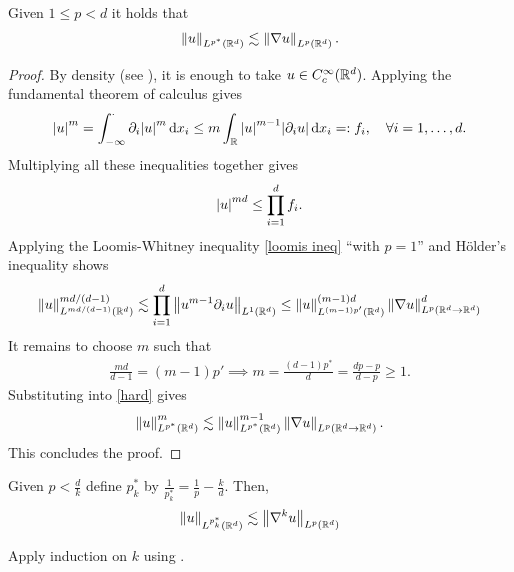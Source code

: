 \documentclass[
    a4paper,
    DIV=14,
    abstract=true,
    numbers=noenddot
]{scrartcl}
\begin{document}
\begin{theorem}\label{est1} Given $1 \leq p<d$ it holds that
	\begin{align}
		\left\lVert u \right\rVert_{L^{p^*}(\mathbb{R}^d)}\lesssim  \left\lVert \nabla u \right\rVert_{L^p (\mathbb{R}^d)}.
	\end{align}
\end{theorem}
\begin{proof}
	By density (see ), it is enough to take $u \in C_c^\infty(\mathbb{R}^d)$. Applying the fundamental theorem of calculus gives
	\begin{align*}
		{\left| u \right|}^m=\int_{-\infty}^\cdot \partial _i {\left| u \right|}^m \,\mathrm{d} x_i  \leq m\int_{\mathbb{R}}{\left| u \right|}^{m-1}{\left| \partial _i u \right|} \,\mathrm{d} x_i=: f_i , \quad\forall i=1,\ldots,d.
	\end{align*}
	Multiplying all these inequalities together gives
	\begin{align*}
		{\left| u \right|}^{md} \leq \prod_{i=1}^{d} f_i   .
	\end{align*}
	Applying the Loomis-Whitney inequality \eqref{loomis ineq}  ``with $p=1$'' and Hölder's inequality shows
	\begin{align}\label{hard}
		\left\lVert u \right\rVert_{L^{ md /(d-1)}(\mathbb{R}^d)}^{md/(d-1)}\lesssim  \prod_{i=1}^{d}  \left\lVert u^{m-1}\partial_iu \right\rVert_{L^1(\mathbb{R}^d)} \leq \left\lVert u \right\rVert_{L^{(m-1)p'}(\mathbb{R}^d)}^{(m-1)d}\left\lVert \nabla u \right\rVert_{L^{p}(\mathbb{R}^d \to  \mathbb{R}^d)}^d
	\end{align}
	It remains to choose $m$ such that
	\begin{align*}
		\frac{md}{d-1}= (m-1)p' \implies m= \frac{(d-1)p^*}{d} =\frac{dp -p}{d-p} \geq 1.
	\end{align*}
	Substituting into \eqref{hard} gives
	\begin{align*}
		\left\lVert u \right\rVert_{L^{ p^*}(\mathbb{R}^d)}^{m}\lesssim \left\lVert u \right\rVert_{L^{p^*}(\mathbb{R}^d)}^{m-1}\left\lVert \nabla u \right\rVert_{L^{p}(\mathbb{R}^d \to  \mathbb{R}^d)} .
	\end{align*}
	This concludes the proof.
\end{proof}
\begin{exercise}\label{est12}
	Given $ p<\frac{d}{k}$ define    $p_k^*$ by $\frac{1}{p_k^*}=\frac{1}{p}-\frac{k}{d}$. Then,        \begin{align*}
		\left\lVert u \right\rVert_{L^{p_k^*}(\mathbb{R}^d)} \lesssim  \left\lVert \nabla^k u \right\rVert_{L^p(\mathbb{R}^d)}    \end{align*}
\end{exercise}
\begin{hint}
	Apply induction on $k$ using .
\end{hint}
\end{document}
